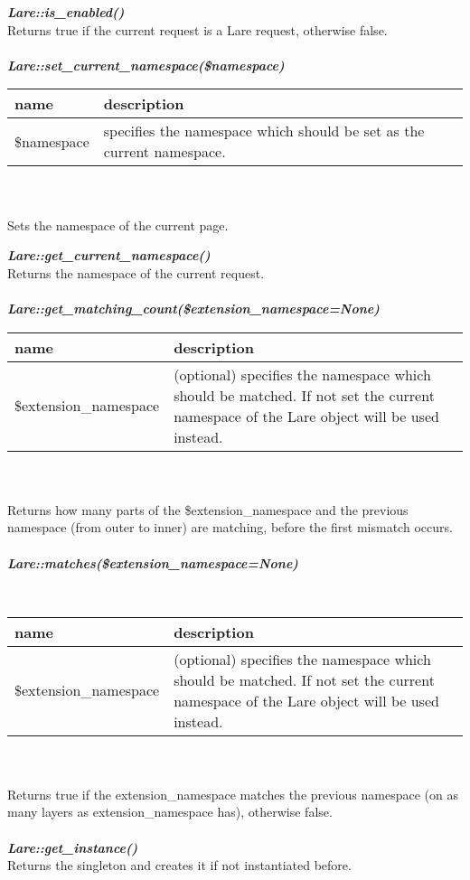 \large{\textbf{\textit{Lare::is\_enabled()}}}
\\
Returns true if the current request is a Lare request, otherwise false.
\\
\\
\large{\textit{\textbf{Lare::set\_current\_namespace(\$namespace)}}}
\\
\begin{tabular}{|p{4cm}|p{9.3cm}|}
    \hline
    \textbf{name} & \textbf{description} \\
    \hline
    \$namespace & specifies the namespace which should be set as the current namespace. \\
    \hline
\end{tabular}
\\
\\
Sets the namespace of the current page.
\\
\newpage{}
\noindent{}\large{\textbf{\textit{Lare::get\_current\_namespace()}}
\\
Returns the namespace of the current request.
\\
\\
\large{\textbf{\textit{Lare::get\_matching\_count(\$extension\_namespace=None)}}}
\\
\begin{tabular}{|p{5cm}|p{8.3cm}|}
    \hline
    \textbf{name} & \textbf{description} \\
    \hline
    \$extension\_namespace & (optional) specifies the namespace which should be matched. If not set the current namespace of the Lare object will be used instead. \\
    \hline
\end{tabular}
\\
\\
Returns how many parts of the \$extension\_namespace and the previous name\-space (from outer to inner) are matching, before the first mismatch occurs.
\\
\\
\large{\textbf{\textit{Lare::matches(\$extension\_namespace=None)}}}}
\\
\begin{tabular}{|p{5cm}|p{8.3cm}|}
    \hline
    \textbf{name} & \textbf{description} \\
    \hline
    \$extension\_namespace & (optional) specifies the namespace which should be matched. If not set the current namespace of the Lare object will be used instead. \\
    \hline
\end{tabular}
\\
\\
Returns true if the extension\_namespace matches the previous namespace (on as many layers as extension\_namespace has), otherwise false.
\\
\\
\large{\textbf{\textit{Lare::get\_instance()}}}
\\
Returns the \lare{} singleton and creates it if not instantiated before.

